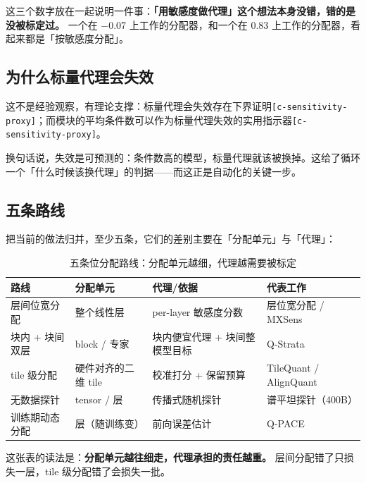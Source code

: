 这三个数字放在一起说明一件事：\textbf{「用敏感度做代理」这个想法本身没错，错的是没被标定过。} 一个在 −0.07 上工作的分配器，和一个在 0.83 上工作的分配器，看起来都是「按敏感度分配」。


\subsection{为什么标量代理会失效}

这不是经验观察，有理论支撑：标量代理会失效存在下界证明{\scriptsize\texttt{[c-\hspace{0pt}sensitivity-\hspace{0pt}proxy]}}；而模块的平均条件数可以作为标量代理失效的实用指示器{\scriptsize\texttt{[c-\hspace{0pt}sensitivity-\hspace{0pt}proxy]}}。


换句话说，失效是可预测的：条件数高的模型，标量代理就该被换掉。这给了循环一个「什么时候该换代理」的判据——而这正是自动化的关键一步。


\subsection{五条路线}

把当前的做法归并，至少五条，它们的差别主要在「分配单元」与「代理」：


\begin{table}[t]
\centering
\footnotesize
\setlength{\tabcolsep}{4pt}
\caption{五条位分配路线：分配单元越细，代理越需要被标定}
\label{tab:3}
\begin{tabular}{llll}
\toprule
路线 & 分配单元 & 代理/依据 & 代表工作 \\
\midrule
层间位宽分配 & 整个线性层 & per-layer 敏感度分数 & 层位宽分配 / MXSens \\
块内 + 块间双层 & block / 专家 & 块内便宜代理 + 块间整模型目标 & Q-Strata \\
tile 级分配 & 硬件对齐的二维 tile & 校准打分 + 保留预算 & TileQuant / AlignQuant \\
无数据探针 & tensor / 层 & 传播式随机探针 & 谱平坦探针（400B） \\
训练期动态分配 & 层（随训练变） & 前向误差估计 & Q-PACE \\
\bottomrule
\end{tabular}
\end{table}

这张表的读法是：\textbf{分配单元越往细走，代理承担的责任越重。} 层间分配错了只损失一层，tile 级分配错了会损失一批。



